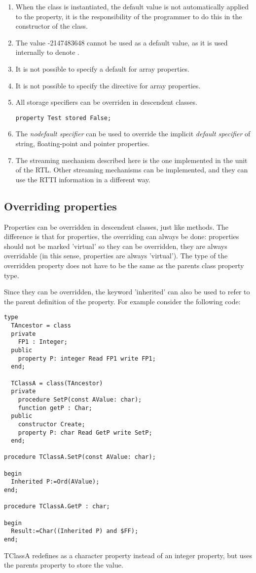 \begin{remark}
\begin{enumerate}
\item When the class is instantiated, the default value is not automatically
applied to the property, it is the responsibility of the programmer to do
this in the constructor of the class.
\item The value -2147483648 cannot be used as a default value, as it is used
internally to denote .
\item It is not possible to specify a default for array properties.
\item It is not possible to specify the  directive for array properties.
\item All storage specifiers can be overriden in descendent classes.
\begin{verbatim}
property Test stored False;
\end{verbatim}
\item The {\em nodefault specifier} can be used to override the implicit
{\em default specifier} of string, floating-point and pointer properties.
\item The streaming mechanism described here is the one implemented in the
 unit of the RTL. Other streaming mechanisms can be
implemented, and they can use the RTTI information in a different way.
\end{enumerate}
\end{remark}

\subsection{Overriding properties}
Properties can be overridden in descendent classes, just like methods. The
difference is that for properties, the overriding can always be done:
properties should not be marked 'virtual' so they can be overridden, they
are always overridable (in this sense, properties are always 'virtual').
The type of the overridden property does not have to be the same as the
parents class property type.

Since they can be overridden, the keyword 'inherited'  can
also be used to refer to the parent definition of the property. For example
consider the following code:
\begin{verbatim}
type
  TAncestor = class
  private
    FP1 : Integer;
  public
    property P: integer Read FP1 write FP1;
  end;
 
  TClassA = class(TAncestor)
  private
    procedure SetP(const AValue: char);
    function getP : Char;
  public
    constructor Create;
    property P: char Read GetP write SetP;
  end;

procedure TClassA.SetP(const AValue: char);

begin
  Inherited P:=Ord(AValue);
end;

procedure TClassA.GetP : char;

begin
  Result:=Char((Inherited P) and $FF);
end;
\end{verbatim}
TClassA redefines  as a character property instead of an integer
property, but uses the parents  property to store the value.

